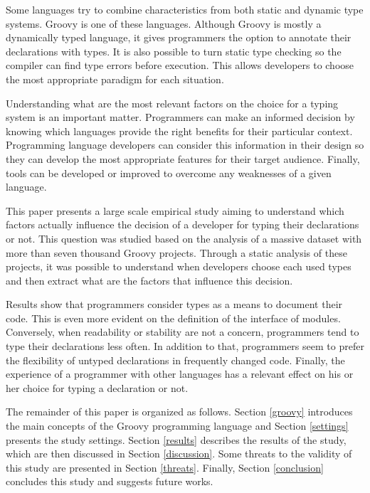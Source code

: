 \documentclass[preprint]{sigplanconf}
\begin{document}
Some languages try to combine characteristics from both static and dynamic type systems.
Groovy\cite{groovy} is one of these languages.
Although Groovy is mostly a dynamically typed language, it gives programmers the option to annotate their declarations with types.
It is also possible to turn static type checking so the compiler can find type errors before execution.
This allows developers to choose the most appropriate paradigm for each situation.

Understanding what are the most relevant factors on the choice for a typing system is an important matter.
Programmers can make an informed decision by knowing which languages provide the right benefits for their particular context.
Programming language developers can consider this information in their design so they can develop the most appropriate features for their target audience.
Finally, tools can be developed or improved to overcome any weaknesses of a given language. 

This paper presents a large scale empirical study aiming to understand which factors actually influence the decision of a developer for typing their declarations or not. 
This question was studied based on the analysis of a massive dataset with more than seven thousand Groovy projects.
Through a static analysis of these projects, it was possible to understand when developers choose each used types and then extract what are the factors that influence this decision.

Results show that programmers consider types as a means to document their code.
This is even more evident on the definition of the interface of modules.
Conversely, when readability or stability are not a concern, programmers tend to type their declarations less often.
In addition to that, programmers seem to prefer the flexibility of untyped declarations in frequently changed code.
Finally, the experience of a programmer with other languages has a relevant effect on his or her choice for typing a declaration or not.

The remainder of this paper is organized as follows. 
Section \ref{groovy} introduces the main concepts of the Groovy programming language and Section \ref{settings} presents the study settings.
Section \ref{results} describes the results of the study, which are then discussed in Section \ref{discussion}.
Some threats to the validity of this study are presented in Section \ref{threats}.
Finally, Section \ref{conclusion} concludes this study and suggests future works.
\end{document}
